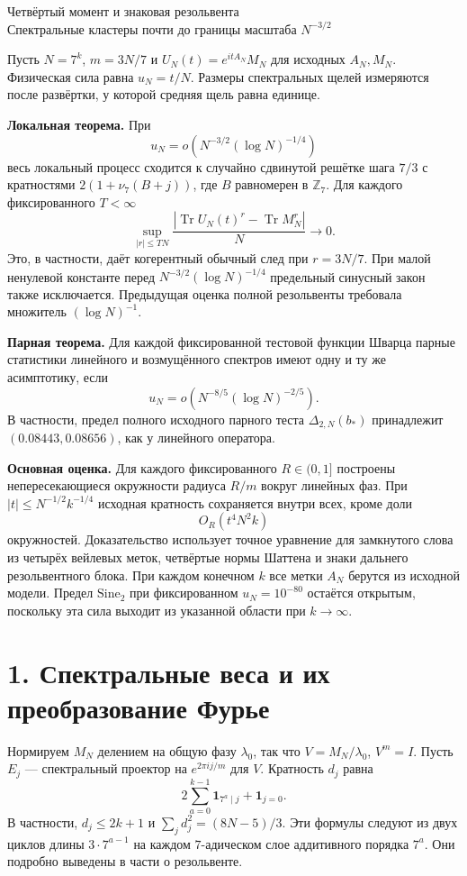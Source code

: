 \documentclass[11pt,a4paper]{article}
\newcommand{\Tr}{\operatorname{Tr}}
\newcommand{\sect}[1]{\section*{\sffamily\color{ink}#1}}
\newcommand{\subt}[1]{\par\medskip\noindent\textbf{#1.}\quad}
\begin{document}
\begin{center}{\LARGE\sffamily Четвёртый момент и знаковая резольвента}\\[4pt]
{\large Спектральные кластеры почти до границы масштаба \(N^{-3/2}\)}
\end{center}
Пусть \(N=7^k\), \(m=3N/7\) и \(U_N(t)=e^{itA_N}M_N\) для исходных \(A_N,M_N\). Физическая сила равна \(u_N=t/N\). Размеры спектральных щелей измеряются после развёртки, у которой средняя щель равна единице.

\subt{Локальная теорема}
При
\[
             u_N=o\!\left(N^{-3/2}(\log N)^{-1/4}\right)
\]
весь локальный процесс сходится к случайно сдвинутой решётке шага \(7/3\) с кратностями \(2(1+\nu_7(B+j))\), где \(B\) равномерен в \(\mathbb Z_7\). Для каждого фиксированного \(T<\infty\)
\[
     \sup_{|r|\le TN}\frac{|\Tr U_N(t)^r-\Tr M_N^r|}{N}\longrightarrow0.
\]
Это, в частности, даёт когерентный обычный след при \(r=3N/7\). При малой ненулевой константе перед \(N^{-3/2}(\log N)^{-1/4}\) предельный синусный закон также исключается. Предыдущая оценка полной резольвенты требовала множитель \((\log N)^{-1}\).

\subt{Парная теорема}
Для каждой фиксированной тестовой функции Шварца парные статистики линейного и возмущённого спектров имеют одну и ту же асимптотику, если
\[
              u_N=o\!\left(N^{-8/5}(\log N)^{-2/5}\right).
\]
В частности, предел полного исходного парного теста \(\Delta_{2,N}(b_*)\) принадлежит \((0.08443,0.08656)\), как у линейного оператора.

\subt{Основная оценка}
Для каждого фиксированного \(R\in(0,1]\) построены непересекающиеся окружности радиуса \(R/m\) вокруг линейных фаз. При \(|t|\le N^{-1/2}k^{-1/4}\) исходная кратность сохраняется внутри всех, кроме доли
\[
                          O_R(t^4 N^2 k)
\]
окружностей. Доказательство использует точное уравнение для замкнутого слова из четырёх вейлевых меток, четвёртые нормы Шаттена и знаки дальнего резольвентного блока. При каждом конечном \(k\) все метки \(A_N\) берутся из исходной модели. Предел \(\mathrm{Sine}_2\) при фиксированном \(u_N=10^{-80}\) остаётся открытым, поскольку эта сила выходит из указанной области при \(k\to\infty\).
\newpage
\sect{1. Спектральные веса и их преобразование Фурье}
Нормируем \(M_N\) делением на общую фазу \(\lambda_0\), так что \(V=M_N/\lambda_0\), \(V^m=I\). Пусть \(E_j\) --- спектральный проектор на \(e^{2\pi i j/m}\) для \(V\). Кратность \(d_j\) равна
\[
           2\sum_{a=0}^{k-1}\mathbf1_{7^a\mid j}+\mathbf1_{j=0}.
\]
В частности, \(d_j\le 2k+1\) и \(\sum_j d_j^2=(8N-5)/3\). Эти формулы следуют из двух циклов длины \(3\cdot7^{a-1}\) на каждом \(7\)-адическом слое аддитивного порядка \(7^a\). Они подробно выведены в части о резольвенте.
\end{document}
